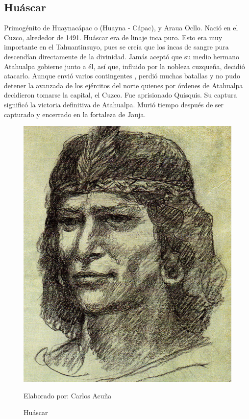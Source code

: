\documentclass[a4paper, openright, 12pt]{report}
\begin{document}
\subsection*{Huáscar}
\justify
Primogénito de Huaynacápac o (Huayna - Cápac), y Araua Ocllo. Nació en el Cuzco, alrededor de 1491. Huáscar era de linaje inca puro. Esto era muy importante en el Tahuantinsuyo, pues se creía que los incas de sangre pura descendían directamente de la divinidad. Jamás aceptó que su medio hermano Atahualpa gobierne junto a él, así que, influido por la nobleza cuzqueña, decidió atacarlo. Aunque envió varios contingentes , perdió  muchas batallas y no pudo detener la avanzada de los ejércitos del norte quienes por órdenes de Atahualpa decidieron tomarse la capital, el Cuzco. Fue aprisionado Quisquis. Su captura significó la victoria definitiva de Atahualpa. Murió tiempo después de ser capturado y encerrado en la fortaleza de Jauja. \cite{2010batallas}

\begin{figure}[h]
\captionsetup{justification=centering,margin=2cm}
\includegraphics[scale=1]{h4}
\centering
\caption{Huáscar}
Elaborado por: Carlos Acuña
\label{fig:h4}
\end{figure}
\clearpage
\end{document}
